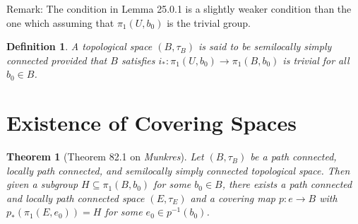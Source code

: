 \documentclass[11pt]{book}
\theoremstyle{break}
\theoremstyle{break}
\newtheorem{thm}{Theorem}[section]
\newtheorem{defn}{Definition}[corL]
\newcommand{\remark}{\color{blue}Remark: \color{black}}
\begin{document}
\remark The condition in Lemma 25.0.1 is a slightly weaker condition than the one which assuming that $\pi_1(U,b_0)$ is the trivial group. 

\begin{defn}
A topological space $(B,\tau_B)$ is said to be semilocally simply connected provided that $B$ satisfies $i_*:\pi_1(U, b_0) \to \pi_1(B,b_0)$ is trivial for all $b_0 \in B$. 
\end{defn}

\newpage
\section[Existence of Covering Spaces]{\color{red}Existence of Covering Spaces\color{black}}
\begin{thm}[Theorem 82.1 on \textit{Munkres}]
Let $(B,\tau_B)$ be a path connected, locally path connected, and semilocally simply connected topological space. Then given a subgroup $H \subseteq \pi_{1}(B,b_0)$ for some $b_0 \in B$, there exists a path connected and locally path connected space $(E,\tau_E)$ and a covering map $p:e \to B$ with $p_*(\pi_1(E,e_0)) = H $ for some $e_0 \in p^{-1}(b_0)$.  
\end{thm}
\end{document}
